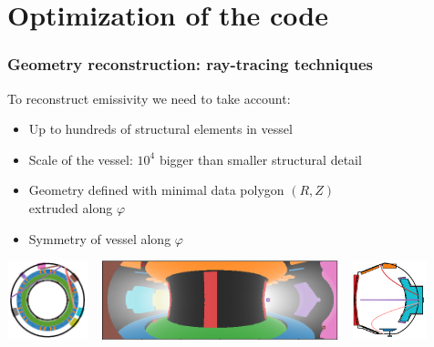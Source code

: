 \documentclass[10pt]{beamer}
\begin{document}
\section{Optimization of the code}

\begin{frame}
\frametitle{Geometry reconstruction: ray-tracing techniques}

	To reconstruct emissivity we need to take account:
	\begin{itemize}
	\item Up to hundreds of structural elements in vessel
	\item Scale of the vessel:
	$10^4$ bigger than smaller structural detail

	\item Geometry defined with minimal data polygon $(R,Z)$\\ extruded along $\varphi$
	\item Symmetry of vessel along $\varphi$
	
	\end{itemize}
	
	\vspace{0.5cm}
	\begin{center}
		\includegraphics[height=2.3cm]{figures/confB3_wp_view2.png}%
		~
		\includegraphics[height=2.3cm]{figures/confB3_wp_view1.png}%
		~
		\includegraphics[height=2.3cm]{figures/confB3_wp_view3.png}%
	\end{center}
	
\end{frame}
\end{document}
